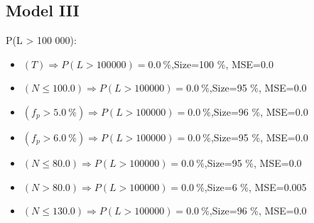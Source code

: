 \documentclass[numbered]{CSL}
\begin{document}
\subsection{Model III}
P(L > 100 000):
\begin{itemize}
\item $(T) \Rightarrow P(L > 100 000) = 0.0~\%$,\hfill Size=100 \%, MSE=0.0
\item $(N \leq 100.0) \Rightarrow P(L > 100 000) = 0.0~\%$,\hfill Size=95 \%, MSE=0.0
\item $(f_p > 5.0~\%) \Rightarrow P(L > 100 000) = 0.0~\%$,\hfill Size=96 \%, MSE=0.0
\item $(f_p > 6.0~\%) \Rightarrow P(L > 100 000) = 0.0~\%$,\hfill Size=95 \%, MSE=0.0
\item $(N \leq 80.0) \Rightarrow P(L > 100 000) = 0.0~\%$,\hfill Size=95 \%, MSE=0.0
\item $(N > 80.0) \Rightarrow P(L > 100 000) = 0.0~\%$,\hfill Size=6 \%, MSE=0.005
\item $(N \leq 130.0) \Rightarrow P(L > 100 000) = 0.0~\%$,\hfill Size=96 \%, MSE=0.0
\end{itemize}
\end{document}
